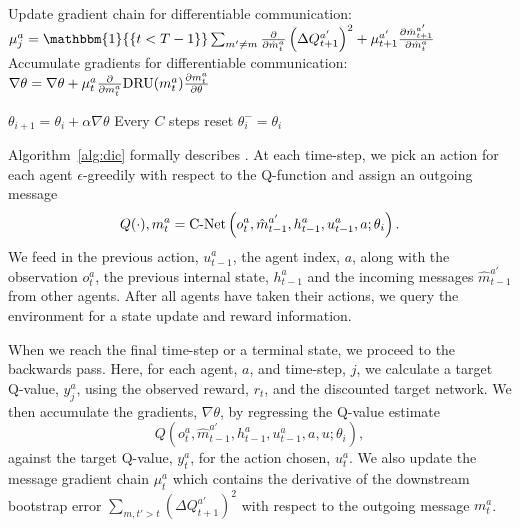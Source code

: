 \begin{algorithm}[tb]
\begin{algorithmic}
             \State Update gradient chain for differentiable communication:
            \State $\mu^a_j=\mathbbm{1}{\{  t<T-1 \}} \sum_{m' \neq m}\frac{\partial }{\partial \hat{m}^a_t}  \left(\Delta Q^{a'}_{t+1} \right)^2 +\mu^{a'}_{t+1}  \frac{\partial \hat{m}^{a'}_{t+1}}{\partial \hat{m}^a_t} $
             \State Accumulate gradients for differentiable communication:
            \State  $\nabla \theta = \nabla \theta + \mu ^a_t   \frac{\partial}{\partial m^a_t}\text{DRU}(m^a_t) \frac{\partial m^a_t}{\partial \theta} $
            
            \State 
        \EndFor
    \EndFor
    \State  $\theta_{i+1} = \theta_i + \alpha \nabla \theta$ %
    \State Every $C$ steps reset $\theta^{-}_{i} = \theta_{i}$
\EndFor
\end{algorithmic}
\end{algorithm}

Algorithm~\ref{alg:dic} formally describes \dic. At each time-step, we pick an action for each agent $\epsilon$-greedily with respect to the Q-function and assign an outgoing message 
\begin{equation}
    Q(\cdot), {m}^{a}_{t} = \text{C-Net}\left(o^a_t,{\hat{m}}^{a'}_{t-1},h^a_{t-1},u^a_{t-1},a; \theta_{i} \right).
\end{equation}
We feed in the previous action, $u^a_{t-1}$, the agent index, $a$, along with the observation $o^a_t$, the previous internal state, $h^a_{t-1}$ and the incoming messages $\hat m^{a'}_{t-1}$ from other agents. After all agents have taken their actions, we query the environment for a state update and reward information. 

When we reach the final time-step or a terminal state, we proceed to the backwards pass. Here, for each agent, $a$, and time-step, $j$, we calculate a target Q-value, $y^a_j$, using the observed reward, $r_t$, and the discounted target network. We then accumulate the gradients, $\nabla \theta$, by regressing the Q-value estimate
\begin{equation}
Q(o^a_t,{\hat{m}}^{a'}_{t-1},h^a_{t-1},u^a_{t-1},a,u; \theta_{i}),    
\end{equation}
against the target Q-value, $y^a_t$, for the action chosen, $u^a_t$. We also update the message gradient chain  $\mu^a_t$ which contains the derivative of the downstream bootstrap error $\sum_{m,  t' > t} \left(\Delta Q^{a'}_{t+1} \right)^2$ with respect to the outgoing message $m^a_t$. 

